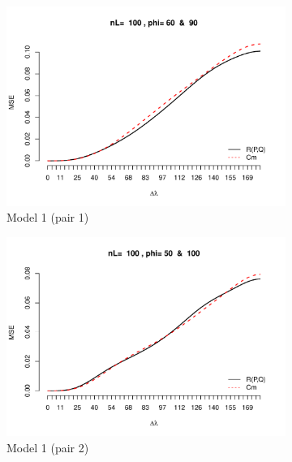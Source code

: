 \begin{figure}[H]
	\begin{subfigure}{.5\textwidth}
		\centering
		\includegraphics[width=1\linewidth]{graphs/MSE_comparison_model1_60_90}
		\caption{Model 1 (pair 1)}
		\label{fig:mse1}
	\end{subfigure}
	\begin{subfigure}{.5\textwidth}
		\centering
		\includegraphics[width=1\linewidth]{graphs/MSE_comparison_model1_50_100}
		\caption{Model 1 (pair 2)}
		\label{fig:mse2}
	\end{subfigure}
		\begin{subfigure}{.5\textwidth}
		\centering

\end{subfigure}
\end{figure}
